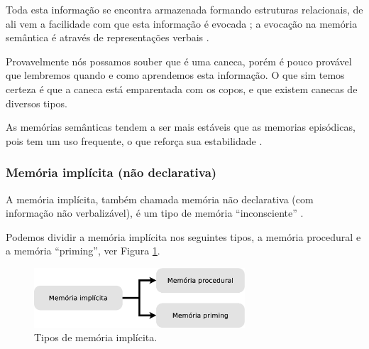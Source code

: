 \begin{itemize}
Toda esta informação se encontra armazenada formando estruturas relacionais, 
de ali vem a facilidade com que esta informação é evocada
\cite[pp. 34]{de2000comprension};
a  evocação na memória semântica é através de representações verbais
\cite[pp. 35]{de2000comprension}.
\begin{example}
Provavelmente nós possamos souber que é uma caneca, 
porém é pouco provável que lembremos quando e como aprendemos esta informação.
O que sim temos  certeza é que a caneca está emparentada com os copos, e que existem canecas de diversos tipos.
\end{example}
As memórias semânticas tendem a ser mais estáveis que as memorias episódicas,
pois tem um uso frequente, o que reforça sua estabilidade \cite[pp. 140]{pake2019psicologia}.
\end{itemize}


\subsubsection{Memória implícita (não declarativa)} 
\label{subsubsec:implicita}
A memória implícita, também chamada memória não declarativa (com informação não verbalizável),
é um tipo de memória ``inconsciente''
\cite[pp. 140]{pake2019psicologia}.

Podemos dividir a memória implícita nos seguintes tipos, 
a memória procedural e 
a memória ``priming'', ver Figura \ref{fig:semantica-episodica}.
\begin{figure}[!h]
  \centering
    \includegraphics[width=0.7\textwidth]{chapters/cap-learning/memory-implicita.eps} 
  \caption{Tipos de  memória implícita.}
\label{fig:semantica-episodica}
\end{figure}

